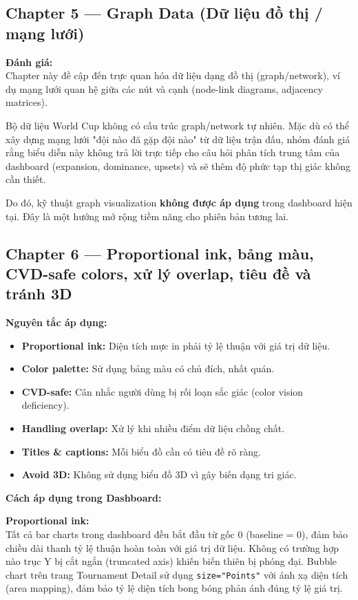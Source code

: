 \documentclass[12pt,a4paper]{article}
\begin{document}
\subsection{Chapter 5 --- Graph Data (Dữ liệu đồ thị / mạng lưới)}
\textbf{Đánh giá:} \\
Chapter này đề cập đến trực quan hóa dữ liệu dạng đồ thị (graph/network), ví dụ mạng lưới quan hệ giữa các nút và cạnh (node-link diagrams, adjacency matrices).

Bộ dữ liệu World Cup không có cấu trúc graph/network tự nhiên. Mặc dù có thể xây dựng mạng lưới "đội nào đã gặp đội nào" từ dữ liệu trận đấu, nhóm đánh giá rằng biểu diễn này không trả lời trực tiếp cho câu hỏi phân tích trung tâm của dashboard (expansion, dominance, upsets) và sẽ thêm độ phức tạp thị giác không cần thiết.

Do đó, kỹ thuật graph visualization \textbf{không được áp dụng} trong dashboard hiện tại. Đây là một hướng mở rộng tiềm năng cho phiên bản tương lai.

\subsection{Chapter 6 --- Proportional ink, bảng màu, CVD-safe colors, xử lý overlap, tiêu đề và tránh 3D}
\textbf{Nguyên tắc áp dụng:}
\begin{itemize}
    \item \textbf{Proportional ink:} Diện tích mực in phải tỷ lệ thuận với giá trị dữ liệu.
    \item \textbf{Color palette:} Sử dụng bảng màu có chủ đích, nhất quán.
    \item \textbf{CVD-safe:} Cân nhắc người dùng bị rối loạn sắc giác (color vision deficiency).
    \item \textbf{Handling overlap:} Xử lý khi nhiều điểm dữ liệu chồng chất.
    \item \textbf{Titles \& captions:} Mỗi biểu đồ cần có tiêu đề rõ ràng.
    \item \textbf{Avoid 3D:} Không sử dụng biểu đồ 3D vì gây biến dạng tri giác.
\end{itemize}

\textbf{Cách áp dụng trong Dashboard:}

\textbf{Proportional ink:} \\
Tất cả bar charts trong dashboard đều bắt đầu từ gốc 0 (baseline = 0), đảm bảo chiều dài thanh tỷ lệ thuận hoàn toàn với giá trị dữ liệu. Không có trường hợp nào trục Y bị cắt ngắn (truncated axis) khiến biến thiên bị phóng đại. Bubble chart trên trang Tournament Detail sử dụng \texttt{size="Points"} với ánh xạ diện tích (area mapping), đảm bảo tỷ lệ diện tích bong bóng phản ánh đúng tỷ lệ giá trị.
\end{document}
